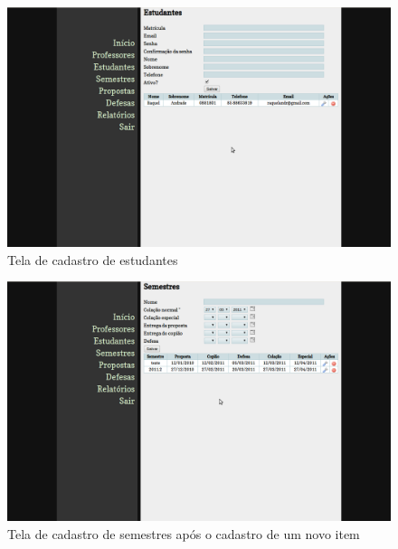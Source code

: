 \begin{figure}[htb!]
\centering
\includegraphics[width=1\textwidth]{fig/telas/administrador/crud_estudante.png}
\caption{Tela de cadastro de estudantes}
\label{fig:crud_estudante}
\end{figure}


\begin{figure}[htb!]
\centering
\includegraphics[width=1\textwidth]{fig/telas/administrador/crud_semestre_calculo_datas.png}
\caption{Tela de cadastro de semestres após o cadastro de um novo item}
\label{fig:crud_semestre_calculo_datas}
\end{figure}

